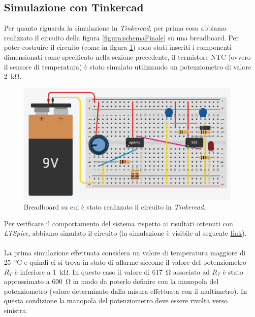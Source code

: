 \documentclass{report}
\begin{document}
\subsection{Simulazione con Tinkercad}\label{tinkercad}
Per quanto riguarda la simulazione in \textit{Tinkercad}, per prima cosa abbiamo realizzato il circuito della figura \ref{figura:schemaFinale} su una breadboard. Per poter costruire il circuito (come in figura \ref{figura:tinkercad_breadboard}) sono stati inseriti i componenti dimensionati come specificato nella sezione precedente, il termistore NTC (ovvero il sensore di temperatura) è stato simulato utilizzando un potenziometro di valore \SI{2}{\kilo\ohm}.

\begin{figure}[h!]
	\centering
	\includegraphics[height=6cm]{immagini/tinkercad_breadboard}
	\caption{Breadboard su cui è stato realizzato il circuito in \textit{Tinkercad}.} 
	\label{figura:tinkercad_breadboard}
\end{figure}

Per verificare il comportamento del sistema rispetto ai risultati ottenuti con \textit{LTSpice}, abbiamo simulato il circuito (la simulazione è visibile al seguente \textcolor{blue}{\underline{\href{https://www.tinkercad.com/things/5cgEecbtMyg-copy-of-stunning-snicket/editel?sharecode=9z73QqFvXyHOBVZMRfgNmmMNsfyYwwq-TDywLOMkaKc}{link}}}).
\\\\\noindent La prima simulazione effettuata considera un valore di temperatura maggiore di \SI{25}{\celsius} e quindi ci si trova in stato di allarme siccome il valore del potenziometro $R_T$ è inferiore a \SI{1}{\kilo\ohm}. In questo caso il valore di \SI{617}{\ohm} associato ad $R_T$ è stato approssimato a \SI{600}{\ohm} in modo da poterlo definire con la manopola del potenziometro (valore determinato dalla misura effettuata con il multimetro). In questa condizione la manopola del potenziometro deve essere rivolta verso sinistra.
\end{document}
